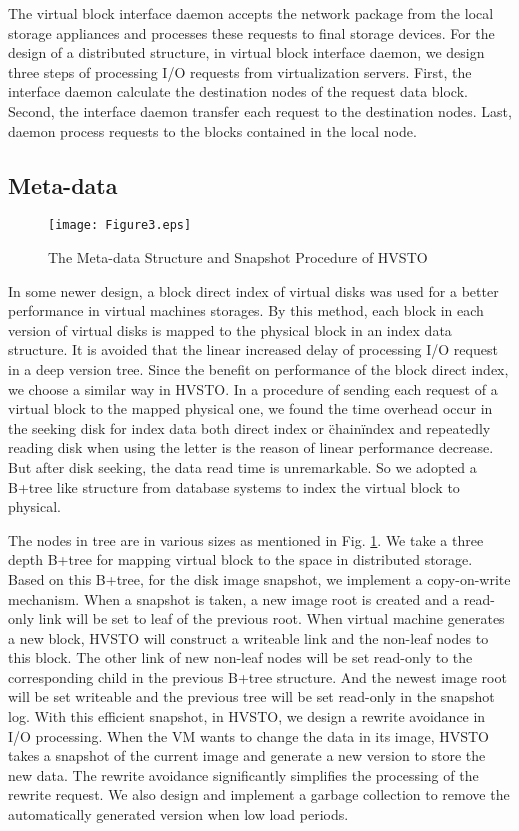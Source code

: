 \documentclass[conference]{IEEEtran}
\begin{document}
The virtual block interface daemon accepts the network package from the local storage appliances and processes these requests to final storage devices. For the design of a distributed structure, in virtual block interface daemon, we design three steps of processing I/O requests from virtualization servers. First, the interface daemon calculate the destination nodes of the request data block. Second, the interface daemon transfer each request to the destination nodes. Last, daemon process requests to the blocks contained in the local node.


\subsection{Meta-data}
\begin{figure}[!ht]
\centering
\texttt{[image: Figure3.eps]}
\caption{The Meta-data Structure and Snapshot Procedure of HVSTO}
\label{figure:metadata}
\end{figure}


In some newer design, a block direct index of virtual disks was used for a better performance in virtual machines storages. By this method, each block in each version of virtual disks is mapped to the physical block in an index data structure. It is avoided that the linear increased delay of processing I/O request in a deep version tree. Since the benefit on performance of the block direct index, we choose a similar way in HVSTO. In a procedure of sending each request of a virtual block to the mapped physical one, we found the time overhead occur in the seeking disk for index data both direct index or \"chain\" index and repeatedly reading disk when using the letter is the reason of linear performance decrease. But after disk seeking, the data read time is unremarkable. So we adopted a B+tree like structure from database systems to index the virtual block to physical.

The nodes in tree are in various sizes as mentioned in Fig. \ref{figure:metadata}. We take a three depth B+tree for mapping virtual block to the space in distributed storage.
Based on this B+tree, for the disk image snapshot, we implement a copy-on-write mechanism. When a snapshot is taken, a new image root is created and a read-only link will be set to leaf of the previous root. When virtual machine generates a new block, HVSTO will construct a writeable link and the non-leaf nodes to this block. The other link of new non-leaf nodes will be set read-only to the corresponding child in the previous B+tree structure. And the newest image root will be set writeable and the previous tree will be set read-only in the snapshot log. With this efficient snapshot, in HVSTO, we design a rewrite avoidance in I/O processing. When the VM wants to change the data in its image, HVSTO takes a snapshot of the current image and generate a new version to store the new data. The rewrite avoidance significantly simplifies the processing of the rewrite request. We also design and implement a garbage collection to remove the automatically generated version when low load periods. 
\end{document}
